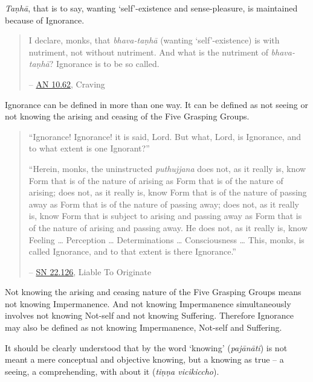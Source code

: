 \emph{Taṇhā}, that is to say, wanting `self'-existence and sense-pleasure, is maintained because of Ignorance.

\begin{quote}
I declare, monks, that \emph{bhava-taṇhā} (wanting `self'-existence) is with nutriment, not without nutriment. And what is the nutriment of \emph{bhava-taṇhā}? Ignorance is to be so called.

 -- \href{https://suttacentral.net/an10.62/en/bodhi}{AN 10.62}, Craving
\end{quote}

Ignorance can be defined in more than one way. It can be defined as not seeing or not knowing the arising and ceasing of the Five Grasping Groups.

\begin{quote}
``Ignorance! Ignorance! it is said, Lord. But what, Lord, is Ignorance, and to what extent is one Ignorant?''

``Herein, monks, the uninstructed \emph{puthujjana} does not, as it really is, know Form that is of the nature of arising as Form that is of the nature of arising; does not, as it really is, know Form that is of the nature of passing away as Form that is of the nature of passing away; does not, as it really is, know Form that is subject to arising and passing away as Form that is of the nature of arising and passing away. He does not, as it really is, know Feeling \ldots\hspace{0pt} Perception \ldots\hspace{0pt} Determinations \ldots\hspace{0pt} Consciousness \ldots\hspace{0pt} This, monks, is called Ignorance, and to that extent is there Ignorance.''

 -- \href{https://suttacentral.net/sn22.126/en/sujato}{SN 22.126}, Liable To Originate
\end{quote}

Not knowing the arising and ceasing nature of the Five Grasping Groups means not knowing Impermanence. And not knowing Impermanence simultaneously involves not knowing Not-self and not knowing Suffering. Therefore Ignorance may also be defined as not knowing Impermanence, Not-self and Suffering.

It should be clearly understood that by the word `knowing' (\emph{pajānāti}) is not meant a mere conceptual and objective knowing, but a knowing as true -- a seeing, a comprehending, with  about it (\emph{tiṇṇa vicikiccho}).

